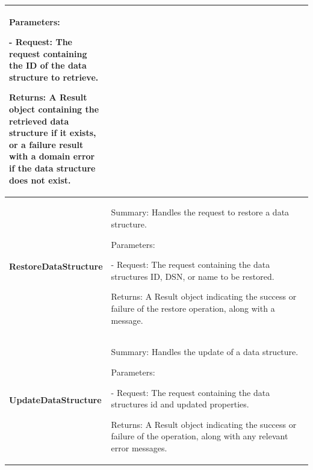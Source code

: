 \begin{longtable}
\begin{tabular}{|p{0.25\linewidth}|p{0.75\linewidth}|}
Parameters:

- Request: The request containing the ID of the data structure to retrieve.

Returns: A Result object containing the retrieved data structure if it exists, or a failure result with a domain error if the data structure does not exist.
\\
\hline \textbf{RestoreDataStructure} & Summary: Handles the request to restore a data structure.

Parameters:

- Request: The request containing the data structures ID, DSN, or name to be restored.

Returns: A Result object indicating the success or failure of the restore operation, along with a message.
\\
\hline \textbf{UpdateDataStructure} & Summary: Handles the update of a data structure.

Parameters:

- Request: The request containing the data structures id and updated properties.

Returns: A Result object indicating the success or failure of the operation, along with any relevant error messages.
\\

        \hline
    \end{tabular}
\end{longtable}





\newpage
